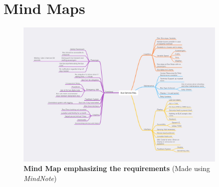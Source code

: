 
\section{Mind Maps}
\begin{center}
    \begin{figure}[H]
        \centering
        \includegraphics[width=0.9\textwidth,trim={1cm 0cm 0cm 2cm}, clip]{./Files/Images/MindMap.jpg}
        \caption{\textbf{Mind Map emphasizing the requirements} (Made using \textit{MindNote})}
    \end{figure}
    \end{center}